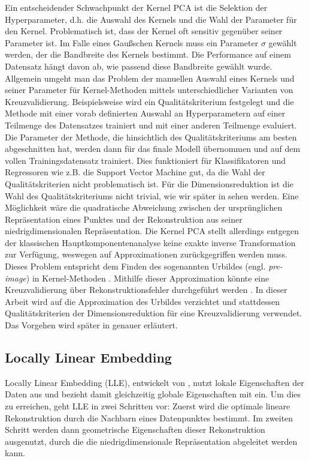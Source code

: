 Ein entscheidender Schwachpunkt der Kernel PCA ist die Selektion der Hyperparameter, d.h. die
Auswahl des Kernels und die Wahl der Parameter für den Kernel. Problematisch ist, dass der Kernel
oft sensitiv gegenüber seiner Parameter ist. Im Falle eines Gaußschen Kernels muss ein Parameter
$\sigma$ gewählt werden, der die Bandbreite des Kernels bestimmt. Die Performance auf einem
Datensatz hängt davon ab, wie passend diese Bandbreite gewählt wurde. Allgemein umgeht man das
Problem der manuellen Auswahl eines Kernels und seiner Parameter für Kernel-Methoden mittels
unterschiedlicher Varianten von Kreuzvalidierung. Beispielsweise wird ein Qualitätskriterium
festgelegt und die Methode mit einer vorab definierten Auswahl an Hyperparametern auf einer
Teilmenge des Datensatzes trainiert und mit einer anderen Teilmenge evaluiert. Die Parameter der
Methode, die hinsichtlich des Qualitätskriteriums am besten abgeschnitten hat, werden dann für das
finale Modell übernommen und auf dem vollen Trainingsdatensatz trainiert. Dies funktioniert für
Klassifikatoren und Regressoren wie z.B. die Support Vector Machine gut, da die Wahl der
Qualitätskriterien nicht problematisch ist. Für die Dimensionsreduktion ist die Wahl des
Qualitätskriteriums nicht trivial, wie wir später in
 sehen werden. Eine Möglichkeit
wäre die quadratische Abweichung zwischen der ursprünglichen Repräsentation eines Punktes und der
Rekonstruktion aus seiner niedrigdimensionalen Repräsentation. Die Kernel PCA stellt allerdings
entgegen der klassischen Hauptkomponentenanalyse keine exakte inverse Transformation zur Verfügung,
weswegen auf Approximationen zurückgegriffen werden muss. Dieses Problem entspricht dem Finden des
sogenannten Urbildes (engl. \textit{pre-image}) in Kernel-Methoden \parencite{Kwok.2004}. Mithilfe dieser Approximation könnte eine Kreuzvalidierung über
Rekonstruktionsfehler durchgeführt werden \parencite[siehe z.B.][]{Alam.2014}. In dieser Arbeit wird auf die Approximation des Urbildes
verzichtet und stattdessen Qualitätskriterien der Dimensionsreduktion für eine Kreuzvalidierung
verwendet. Das Vorgehen wird später in 
genauer erläutert.
\subsection{Locally Linear Embedding}
\label{ch:MethodenDerDimRed:statistisch:LLE}
Locally Linear Embedding (LLE), entwickelt von \textcite{Roweis.2000}, nutzt lokale Eigenschaften der Daten aus und bezieht damit gleichzeitig globale Eigenschaften mit ein. Um dies zu erreichen, geht LLE in zwei Schritten vor: Zuerst wird die optimale lineare Rekonstruktion durch die Nachbarn eines Datenpunktes bestimmt. Im zweiten Schritt werden dann geometrische Eigenschaften dieser Rekonstruktion ausgenutzt, durch die die niedrigdimensionale Repräsentation abgeleitet werden kann.

